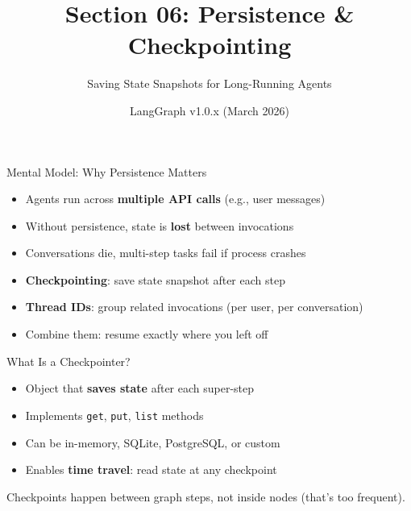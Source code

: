 \documentclass[aspectratio=169,11pt]{beamer}
\title{Section 06: Persistence \& Checkpointing}
\subtitle{Saving State Snapshots for Long-Running Agents}
\author{LangGraph v1.0.x (March 2026)}
\date{}
\begin{document}
\frame{\titlepage}

\begin{frame}{Mental Model: Why Persistence Matters}
  \begin{conceptbox}
    \setlength{\itemsep}{1pt}
    \begin{itemize}
      \item Agents run across \textbf{multiple API calls} (e.g., user messages)
      \item Without persistence, state is \textbf{lost} between invocations
      \item Conversations die, multi-step tasks fail if process crashes
    \end{itemize}
  \end{conceptbox}
  \vspace{0.1cm}
  \begin{conceptbox}
    \setlength{\itemsep}{1pt}
    \begin{itemize}
      \item \textbf{Checkpointing}: save state snapshot after each step
      \item \textbf{Thread IDs}: group related invocations (per user, per conversation)
      \item Combine them: resume exactly where you left off
    \end{itemize}
  \end{conceptbox}
\end{frame}

\begin{frame}{What Is a Checkpointer?}
  \begin{conceptbox}
    \setlength{\itemsep}{1pt}
    \begin{itemize}
      \item Object that \textbf{saves state} after each super-step
      \item Implements \texttt{get}, \texttt{put}, \texttt{list} methods
      \item Can be in-memory, SQLite, PostgreSQL, or custom
      \item Enables \textbf{time travel}: read state at any checkpoint
    \end{itemize}
  \end{conceptbox}
  \vspace{0.1cm}
  \begin{tipbox}
    Checkpoints happen between graph steps, not inside nodes (that's too frequent).
  \end{tipbox}
\end{frame}
\end{document}
